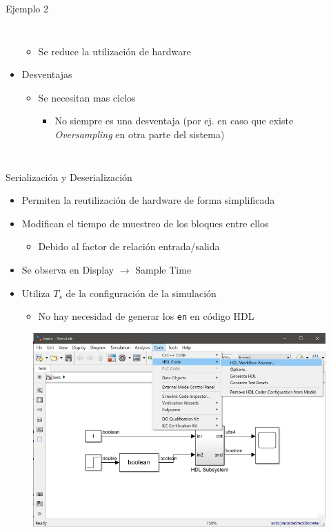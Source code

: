 \documentclass{beamer}
\begin{document}
\begin{frame}{Ejemplo 2}
\begin{columns}
\begin{itemize}
	\begin{itemize}
		\item Se reduce la utilización de hardware
	\end{itemize}
	\item Desventajas
	\begin{itemize}
		\item Se necesitan mas ciclos
		\begin{itemize}
			\item No siempre es una desventaja (por ej. en caso que existe \textit{Oversampling} en otra parte del sistema)
		\end{itemize}
	\end{itemize}
\end{itemize}
\end{columns}
\end{frame}

\begin{frame}{Serialización y Deserialización}
\begin{itemize}
	\item Permiten la reutilización de hardware de forma simplificada
	\item Modifican el tiempo de muestreo de los bloques entre ellos
	\begin{itemize}
		\item Debido al factor de relación entrada/salida
	\end{itemize}
	\item Se observa en Display $\rightarrow$ Sample Time
	\item Utiliza $T_s$ de la configuración de la simulación
	\begin{itemize}
		\item No hay necesidad de generar los \texttt{en} en código HDL
	\end{itemize}
\end{itemize}
\begin{figure}
	\includegraphics[page=9, width=\textwidth]{figs/figs.pdf}
\end{figure}
\end{frame}
\end{document}
